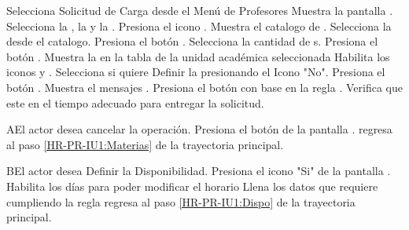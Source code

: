 \begin{UCtrayectoria}
	\UCpaso [\UCactor] Selecciona Solicitud de Carga desde el Menú de Profesores
	\UCpaso [\UCsist]  Muestra la pantalla . 
	\UCpaso [\UCactor] Selecciona la , la  y la .
	\UCpaso [\UCactor] Presiona el icono . \label{HR-PR-IU1:Materias}
	\UCpaso [\UCsist]  Muestra el catalogo de . 
	\UCpaso [\UCactor] Selecciona la  desde el catalogo.
	\UCpaso [\UCactor] Presiona el botón . 
	\UCpaso [\UCactor] Selecciona la cantidad de s.
	\UCpaso [\UCactor] Presiona el botón .
	\UCpaso [\UCsist]  Muestra la  en la tabla de la unidad académica seleccionada
	\UCpaso [\UCsist]  Habilita los iconos  y .
	\UCpaso [\UCactor] Selecciona si quiere Definir la  presionando el Icono "No".   \label{HR-PR-CU1:EdiEli}
	\UCpaso [\UCactor] Presiona el botón .   \label{HR-PR-IU1:Dispo}
	\UCpaso [\UCsist]  Muestra el mensajes .
	\UCpaso [\UCactor] Presiona el botón  con base en la regla . 
	\UCpaso [\UCsist]  Verifica que este en el tiempo adecuado para entregar la solicitud. 
\end{UCtrayectoria}

\begin{UCtrayectoriaA}{A}{El actor desea cancelar la operación.}
	\UCpaso [\UCactor] Presiona el botón  de la pantalla .
	\UCpaso regresa al paso \ref{HR-PR-IU1:Materias} de la trayectoria principal.
\end{UCtrayectoriaA} 

\begin{UCtrayectoriaA}{B}{El actor desea Definir la Disponibilidad.}
	\UCpaso [\UCactor] Presiona el icono "Si" de la pantalla .
	\UCpaso [\UCsist] Habilita los días para poder modificar el horario
	\UCpaso [\UCactor] Llena los datos que requiere cumpliendo la regla 
	\UCpaso regresa al paso \ref{HR-PR-IU1:Dispo} de la trayectoria principal.
\end{UCtrayectoriaA} 

